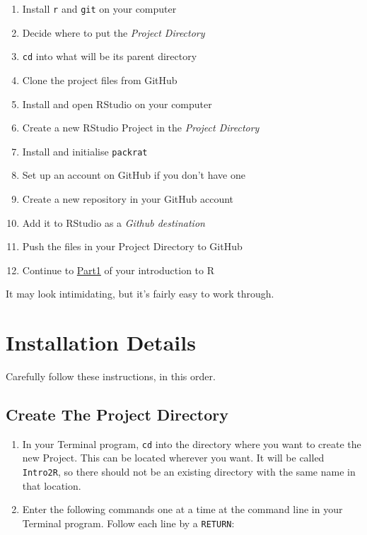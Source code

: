 \documentclass[]{book}
\providecommand{\tightlist}{%
  \setlength{\itemsep}{0pt}\setlength{\parskip}{0pt}}
\theoremstyle{definition}
\theoremstyle{definition}
\theoremstyle{definition}
\theoremstyle{remark}
\begin{document}
\begin{enumerate}
\def\labelenumi{\arabic{enumi}.}
\tightlist
\item
  Install \texttt{r} and \texttt{git} on your computer
\item
  Decide where to put the \emph{Project Directory}
\item
  \texttt{cd} into what will be its parent directory
\item
  Clone the project files from GitHub
\item
  Install and open RStudio on your computer
\item
  Create a new RStudio Project in the \emph{Project Directory}
\item
  Install and initialise \texttt{packrat}
\item
  Set up an account on GitHub if you don't have one
\item
  Create a new repository in your GitHub account
\item
  Add it to RStudio as a \emph{Github destination}
\item
  Push the files in your Project Directory to GitHub
\item
  Continue to \href{Part1_R_Data_Science.html}{Part1} of your
  introduction to R
\end{enumerate}

It may look intimidating, but it's fairly easy to work through.

\hypertarget{installation-details}{%
\section{Installation Details}\label{installation-details}}

Carefully follow these instructions, in this order.

\hypertarget{create-the-project-directory}{%
\subsection{Create The Project
Directory}\label{create-the-project-directory}}

\begin{enumerate}
\def\labelenumi{\arabic{enumi}.}
\item
  In your Terminal program, \texttt{cd} into the directory where you
  want to create the new Project. This can be located wherever you want.
  It will be called \texttt{Intro2R}, so there should not be an existing
  directory with the same name in that location.
\item
  Enter the following commands one at a time at the command line in your
  Terminal program. Follow each line by a \texttt{RETURN}:
\end{enumerate}
\end{document}
